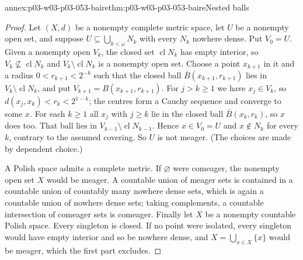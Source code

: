 \begin{annexitem}{annex:p03-w03-p03-053-baire}{thm:p03-w03-p03-053-baire}{Nested balls}
\begin{proof}
Let \((X,d)\) be a nonempty complete metric space, let \(U\) be a nonempty
open set, and suppose \(U\subseteq\bigcup_{k<\omega}N_k\) with every
\(N_k\) nowhere dense. Put \(V_0=U\). Given a nonempty open \(V_k\), the
closed set \(\operatorname{cl}N_k\) has empty interior, so
\(V_k\not\subseteq\operatorname{cl}N_k\) and
\(V_k\setminus\operatorname{cl}N_k\) is a nonempty open set. Choose a
point \(x_{k+1}\) in it and a radius \(0<r_{k+1}<2^{-k}\) such that the
closed ball \(\bar B(x_{k+1},r_{k+1})\) lies in
\(V_k\setminus\operatorname{cl}N_k\), and put
\(V_{k+1}=B(x_{k+1},r_{k+1})\). For \(j>k\ge1\) we have
\(x_j\in V_k\), so \(d(x_j,x_k)<r_k<2^{1-k}\); the centres form a Cauchy
sequence and converge to some \(x\). For each \(k\ge1\) all \(x_j\) with
\(j\ge k\) lie in the closed ball \(\bar B(x_k,r_k)\), so \(x\) does too.
That ball lies in \(V_{k-1}\setminus\operatorname{cl}N_{k-1}\). Hence
\(x\in V_0=U\) and \(x\notin N_k\) for every \(k\), contrary to the
assumed covering. So \(U\) is not meager. (The choices are made by
dependent choice.)

A Polish space admits a complete metric. If \(\varnothing\) were comeager,
the nonempty open set \(X\) would be meager. A countable union of meager
sets is contained in a countable union of countably many nowhere dense
sets, which is again a countable union of nowhere dense sets; taking
complements, a countable intersection of comeager sets is comeager.
Finally let \(X\) be a nonempty countable Polish space. Every singleton is
closed. If no point were isolated, every singleton would have empty
interior and so be nowhere dense, and \(X=\bigcup_{x\in X}\{x\}\) would
be meager, which the first part excludes.
\end{proof}
\end{annexitem}


